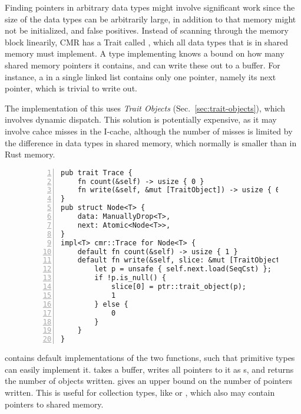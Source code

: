 Finding pointers in arbitrary data types might involve significant work since the size of the data
types can be arbitrarily large, in addition to that memory might not be initialized, and false
positives. Instead of scanning through the memory block linearily,  CMR has a Trait called , which all
data types that is in shared memory must implement.  A type implementing  knows a bound
on how many shared memory pointers it contains, and can write these out to a buffer. For instance,
a  in a single linked list contains only one pointer, namely its next pointer, which is
trivial to write out.

The implementation of this uses \emph{Trait Objects} (Sec.~\ref{sec:trait-objects}), which involves
dynamic dispatch. This solution is potentially expensive, as it may involve cahce misses in the
I-cache, although the number of misses is limited by the difference in data types in shared memory,
which normally is smaller than in Rust memory.

\begin{figure}[t]
  \begin{lstlisting}[caption=Definition of the \code{Trace} trait and a sample implementation for
  a linked list node. The impementation uses \emph{specialization} (Section~\ref{sec:specialization}) as the
  implementation of \code{Node}s containing data that itself is \code{Trace} is different.,
  numbers=left,
  numberstyle=\color{gray}\ttfamily{}T,
  ]
pub trait Trace {
    fn count(&self) -> usize { 0 }
    fn write(&self, &mut [TraitObject]) -> usize { 0 }
}
pub struct Node<T> {
    data: ManuallyDrop<T>,
    next: Atomic<Node<T>>,
}
impl<T> cmr::Trace for Node<T> {
    default fn count(&self) -> usize { 1 }
    default fn write(&self, slice: &mut [TraitObject]) -> usize {
        let p = unsafe { self.next.load(SeqCst) };
        if !p.is_null() {
            slice[0] = ptr::trait_object(p);
            1
        } else {
            0
        }
    }
}\end{lstlisting}
\end{figure}

 contains default implementations of the two functions, such that primitive types can
easily implement it.  takes a buffer, writes all pointers to it as s,
and returns the number of objects written.  gives an upper bound on the number of
pointers written. This is useful for collection types, like  or , which
also may contain pointers to shared memory.

